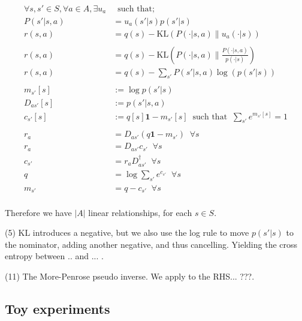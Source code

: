 \begin{align}
\forall s, s' \in S, \forall a \in A, \exists u_a& \;\;\text{such that;} \tag{1}\\
P(s' | s, a) &= u_a(s'|s)p(s'|s) \tag{2}\\
r(s, a) &= q(s) - \text{KL}(P(\cdot | s, a) \parallel u_a(\cdot| s) ) \tag{3}\\
\\
r(s, a) &= q(s) - \text{KL}(P(\cdot | s, a)\parallel\frac{P(\cdot | s, a)}{p(\cdot|s)}) \tag{4}\\
r(s, a) &= q(s) - \sum_{s'}P(s' | s, a) \log(p(s'|s)) \tag{5}\\
\\
m_{s'}[s]&:= \log p(s' | s) \tag{6}\\
D_{as'}[s] &:= p(s'|s, a) \tag{7}\\
c_{s'}[s] &:= q[s] \mathbf 1 - m_{s'}[s] \;\;\text{such that} \;\; \sum_{s'} e^{m_{s'}[s]} = 1 \tag{8}\\
\\
r_a &= D_{as'} ( q \mathbf 1 - m_{s'}) \;\;\forall s \tag{9}\\
r_a &= D_{as'}c_{s'}  \;\;\forall s \tag{10}\\
c_{s'} &= r_aD_{as'}^{\dagger} \;\;\forall s\tag{11}\\
q &= \log \sum_{s'} e^{c_{s'}} \;\;\forall s\tag{12}\\
m_{s'} &= q - c_{s'} \;\;\forall s\tag{14}\\
\end{align}


Therefore we have $|A|$ linear relationships, for each $s\in S$.

(5) KL introduces a negative, but we also use the log rule to move $p(s'|s)$ to the nominator, adding another negative, and thus cancelling. Yielding the cross entropy between .. and ... .

(11) The More-Penrose pseudo inverse. We apply to the RHS... ???.


\subsection{Toy experiments}

